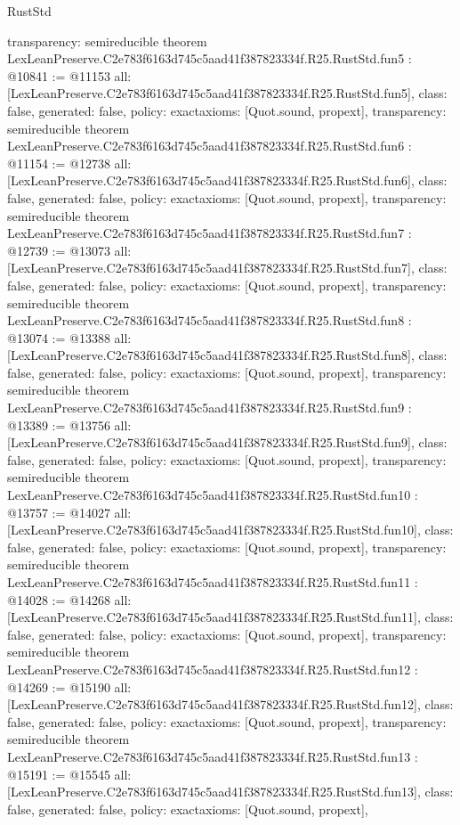 \begin{lexlean}{RustStd}
\begin{coremodule}
{  transparency: semireducible
}
theorem LexLeanPreserve.C2e783f6163d745c5aad41f387823334f.R25.RustStd.fun5 : @10841 := @11153 {
  all: [LexLeanPreserve.C2e783f6163d745c5aad41f387823334f.R25.RustStd.fun5],
  class: false,
  generated: false,
  policy: exact{axioms: [Quot.sound, propext]},
  transparency: semireducible
}
theorem LexLeanPreserve.C2e783f6163d745c5aad41f387823334f.R25.RustStd.fun6 : @11154 := @12738 {
  all: [LexLeanPreserve.C2e783f6163d745c5aad41f387823334f.R25.RustStd.fun6],
  class: false,
  generated: false,
  policy: exact{axioms: [Quot.sound, propext]},
  transparency: semireducible
}
theorem LexLeanPreserve.C2e783f6163d745c5aad41f387823334f.R25.RustStd.fun7 : @12739 := @13073 {
  all: [LexLeanPreserve.C2e783f6163d745c5aad41f387823334f.R25.RustStd.fun7],
  class: false,
  generated: false,
  policy: exact{axioms: [Quot.sound, propext]},
  transparency: semireducible
}
theorem LexLeanPreserve.C2e783f6163d745c5aad41f387823334f.R25.RustStd.fun8 : @13074 := @13388 {
  all: [LexLeanPreserve.C2e783f6163d745c5aad41f387823334f.R25.RustStd.fun8],
  class: false,
  generated: false,
  policy: exact{axioms: [Quot.sound, propext]},
  transparency: semireducible
}
theorem LexLeanPreserve.C2e783f6163d745c5aad41f387823334f.R25.RustStd.fun9 : @13389 := @13756 {
  all: [LexLeanPreserve.C2e783f6163d745c5aad41f387823334f.R25.RustStd.fun9],
  class: false,
  generated: false,
  policy: exact{axioms: [Quot.sound, propext]},
  transparency: semireducible
}
theorem LexLeanPreserve.C2e783f6163d745c5aad41f387823334f.R25.RustStd.fun10 : @13757 := @14027 {
  all: [LexLeanPreserve.C2e783f6163d745c5aad41f387823334f.R25.RustStd.fun10],
  class: false,
  generated: false,
  policy: exact{axioms: [Quot.sound, propext]},
  transparency: semireducible
}
theorem LexLeanPreserve.C2e783f6163d745c5aad41f387823334f.R25.RustStd.fun11 : @14028 := @14268 {
  all: [LexLeanPreserve.C2e783f6163d745c5aad41f387823334f.R25.RustStd.fun11],
  class: false,
  generated: false,
  policy: exact{axioms: [Quot.sound, propext]},
  transparency: semireducible
}
theorem LexLeanPreserve.C2e783f6163d745c5aad41f387823334f.R25.RustStd.fun12 : @14269 := @15190 {
  all: [LexLeanPreserve.C2e783f6163d745c5aad41f387823334f.R25.RustStd.fun12],
  class: false,
  generated: false,
  policy: exact{axioms: [Quot.sound, propext]},
  transparency: semireducible
}
theorem LexLeanPreserve.C2e783f6163d745c5aad41f387823334f.R25.RustStd.fun13 : @15191 := @15545 {
  all: [LexLeanPreserve.C2e783f6163d745c5aad41f387823334f.R25.RustStd.fun13],
  class: false,
  generated: false,
  policy: exact{axioms: [Quot.sound, propext]},
}
\end{coremodule}
\end{lexlean}
